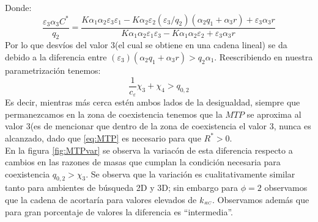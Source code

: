 Donde:
\begin{equation}
  \frac{\varepsilon_3 \alpha_3 C^*}{q_2} = \frac{K \alpha_1 \alpha_2 \varepsilon_3 \varepsilon_1 - K \alpha_2 \varepsilon_2 (\varepsilon_3/q_2) (\alpha_2 q_1 + \alpha_3 r) + \varepsilon_3 \alpha_3 r}{ K \alpha_1\alpha_2 \varepsilon_1 \varepsilon_3 - K \alpha_1\alpha_2 \varepsilon_2 + \varepsilon_3 \alpha_3 r}
\end{equation}
Por lo que desv\'ios del valor 3(el cual se obtiene en una cadena lineal) se da debido a la diferencia entre $(\varepsilon_3)(\alpha_2 q_1 + \alpha_3 r) >  q_2 \alpha_1 $. Reescribiendo en nuestra parametrizaci\'on tenemos:
\begin{equation}\label{eq:MTP}
  \frac{1}{c_\varepsilon} \chi_3 + \chi_4  > q_{0,2}
\end{equation}
Es decir, mientras m\'as cerca est\'en ambos lados de la desigualdad, siempre que permanezcamos en la zona de coexistencia tenemos que la $MTP$ se aproxima al valor $3$(es de mencionar que dentro de la zona de coexistencia el valor 3, nunca es alcanzado, dado que \eqref{eq:MTP} es necesario para que $R^* > 0$.\\

En la figura \ref{fig:MTPvar} se observa la variac\'on de esta diferencia respecto a cambios en las razones de masas que cumplan la condici\'on necesaria para coexistencia $q_{0,2} > \chi_3$. Se observa que la variaci\'on es cualitativamente similar tanto para ambientes de b\'usqueda 2D y 3D; sin embargo para $\phi = 2$ observamos que la cadena de acortar\'ia  para valores elevados de $k_{\textit{\tiny RC}}$. Observamos adem\'as que para gran porcentaje de valores la diferencia es ``intermedia''.

